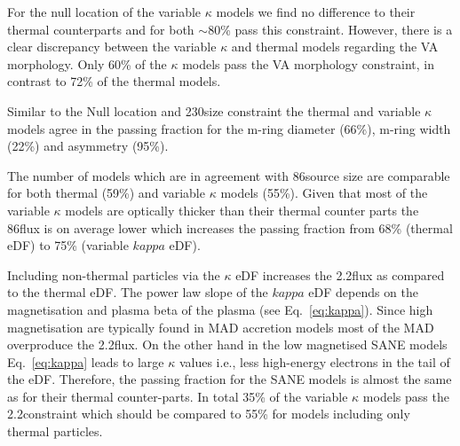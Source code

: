 
For the null location of the variable $\kappa$ models we find no difference to their thermal counterparts and for both $\sim$80\% pass this constraint.
However, there is a clear discrepancy between the variable $\kappa$ and thermal models regarding the VA morphology.
Only 60\% of the $\kappa$ models pass the VA morphology constraint, in contrast to 72\% of the thermal models.


Similar to the Null location and 230\GHz size constraint the thermal and variable $\kappa$ models agree in the passing fraction for the m-ring diameter (66\%), m-ring width (22\%) and asymmetry (95\%).


The number of models which are in agreement with 86\GHz source size are comparable for both thermal (59\%) and variable $\kappa$ models (55\%).
Given that most of the variable $\kappa$ models are optically thicker than their thermal counter parts the 86\GHz flux is on average lower which increases the passing fraction from 68\% (thermal eDF) to 75\% (variable $kappa$ eDF).


Including non-thermal particles via the $\kappa$ eDF increases the 2.2\um flux as compared to the thermal eDF.
The power law slope of the $kappa$ eDF depends on the magnetisation and plasma beta of the plasma (see Eq.~\ref{eq:kappa}).
Since high magnetisation are typically found in MAD accretion models most of the MAD overproduce the 2.2\um flux.
On the other hand in the low magnetised SANE models Eq.~\ref{eq:kappa} leads to large $\kappa$ values i.e., less high-energy electrons in the tail of the eDF.
Therefore, the passing fraction for the SANE models is almost the same as for their thermal counter-parts.
In total 35\% of the variable $\kappa$ models pass the 2.2\um constraint which should be compared to 55\% for models including only thermal particles.


